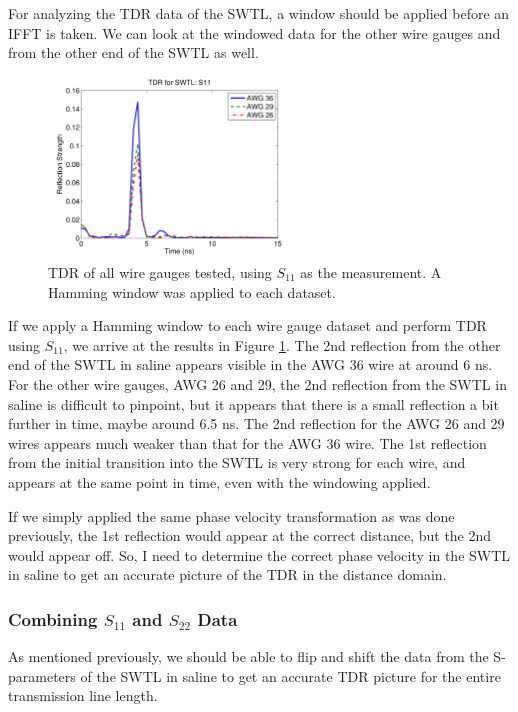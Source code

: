\documentclass[12pt,onecolumn,titlepage]{article}
\begin{document}
For analyzing the TDR data of the SWTL, a window should be applied before an IFFT is taken. We can look at the windowed data for the other wire gauges and from the other end of the SWTL as well.



\begin{figure}[htbp]
	\centering
	\includegraphics[width=0.6\textwidth]{Pictures/22July2013/SWTL_TDR_s11_all_wires_hamming}
	\caption{ TDR of all wire gauges tested, using $S_{11}$ as the measurement. A Hamming window was applied to each dataset. } 
	\label{fig:SWTL_TDR_s11_all_wires_hamming}
\end{figure}


If we apply a Hamming window to each wire gauge dataset and perform TDR using $S_{11}$, we arrive at the results in Figure \ref{fig:SWTL_TDR_s11_all_wires_hamming}. The 2nd reflection from the other end of the SWTL in saline appears visible in the AWG 36 wire at around 6 ns. For the other wire gauges, AWG 26 and 29, the 2nd reflection from the SWTL in saline is difficult to pinpoint, but it appears that there is a small reflection a bit further in time, maybe around 6.5 ns. The 2nd reflection for the AWG 26 and 29 wires appears much weaker than that for the AWG 36 wire. The 1st reflection from the initial transition into the SWTL is very strong for each wire, and appears at the same point in time, even with the windowing applied. 

If we simply applied the same phase velocity transformation as was done previously, the 1st reflection would appear at the correct distance, but the 2nd would appear off. So, I need to determine the correct phase velocity in the SWTL in saline to get an accurate picture of the TDR in the distance domain.


\subsubsection{Combining $S_{11}$ and $S_{22}$ Data}
\indent \indent As mentioned previously, we should be able to flip and shift the data from the S-parameters of the SWTL in saline to get an accurate TDR picture for the entire transmission line length. 
\end{document}
